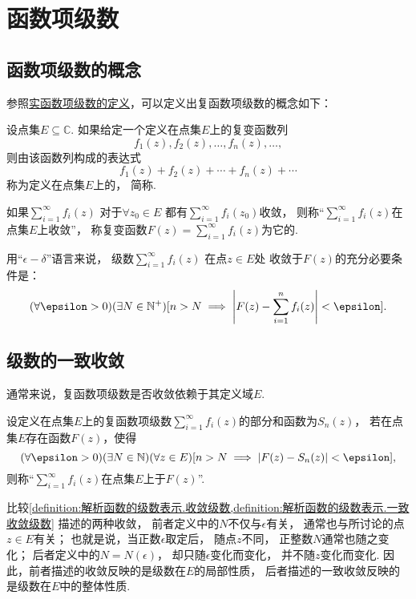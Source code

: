 \section{函数项级数}
\subsection{函数项级数的概念}
参照\hyperref[definition:无穷级数.实函数项级数的概念]{实函数项级数的定义}，可以定义出复函数项级数的概念如下：
\begin{definition}\label{definition:解析函数的级数表示.收敛级数}
设点集\(E \subseteq \mathbb{C}\).
如果给定一个定义在点集\(E\)上的复变函数列\[
	f_1(z), f_2(z), \dotsc, f_n(z), \dotsc,
\]
则由该函数列构成的表达式\[
	f_1(z) + f_2(z) + \dotsb + f_n(z) + \dotsb
\]
称为定义在点集\(E\)上的，
简称.

如果\(\sum_{i=1}^\infty f_i(z)\)
对于\(\forall z_0 \in E\)
都有\(\sum_{i=1}^\infty f_i(z_0)\)收敛，
则称“\(\sum_{i=1}^\infty f_i(z)\)在点集\(E\)上收敛”，
称复变函数\(F(z) = \sum_{i=1}^\infty f_i(z)\)为它的.
\end{definition}
用“\(\epsilon-\delta\)”语言来说，
级数\(\sum_{i=1}^\infty f_i(z)\)
在点\(z \in E\)处
收敛于\(F(z)\)的充分必要条件是：\[
	(\forall \epsilon > 0)
	(\exists N \in \mathbb{N}^+)
	[
		n > N
		\implies
		\abs{F(z) - \sum_{i=1}^n f_i(z)} < \epsilon
	].
\]

\subsection{级数的一致收敛}
通常来说，复函数项级数是否收敛依赖于其定义域\(E\).
\begin{definition}\label{definition:解析函数的级数表示.一致收敛级数}
设定义在点集\(E\)上的复函数项级数\(\sum_{i=1}^\infty f_i(z)\)的部分和函数为\(S_n(z)\)，
若在点集\(E\)存在函数\(F(z)\)，使得\[
	(\forall\epsilon>0)
	(\exists N \in \mathbb{N})
	(\forall z \in E)
	[
		n>N \implies \abs{F(z) - S_n(z)} < \epsilon
	],
\]
则称“\(\sum_{i=1}^\infty f_i(z)\)在点集\(E\)上于\(F(z)\)”.
\end{definition}

比较\cref{definition:解析函数的级数表示.收敛级数,definition:解析函数的级数表示.一致收敛级数} 描述的两种收敛，
前者定义中的\(N\)不仅与\(\epsilon\)有关，
通常也与所讨论的点\(z \in E\)有关；
也就是说，当正数\(\epsilon\)取定后，
随点\(z\)不同，
正整数\(N\)通常也随之变化；
后者定义中的\(N = N(\epsilon)\)，
却只随\(\epsilon\)变化而变化，
并不随\(z\)变化而变化.
因此，前者描述的收敛反映的是级数在\(E\)的局部性质，
后者描述的一致收敛反映的是级数在\(E\)中的整体性质.

